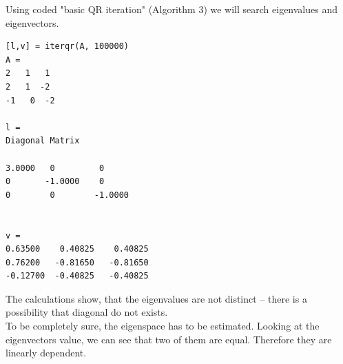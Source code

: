 \documentclass[eng,openany]{mgr}
\begin{document}
Using coded "basic QR iteration" (Algorithm 3) we will search eigenvalues and eigenvectors.

\begin{lstlisting}
[l,v] = iterqr(A, 100000)
A =
2   1   1
2   1  -2
-1   0  -2

l =
Diagonal Matrix

3.0000	 0         0
0		-1.0000    0
0        0        -1.0000


v =
0.63500    0.40825    0.40825 
0.76200   -0.81650   -0.81650 
-0.12700  -0.40825   -0.40825
\end{lstlisting}

The calculations show, that the eigenvalues are not distinct -- there is a possibility that diagonal do not exists.\\
To be completely sure, the eigenspace has to be estimated.
Looking at the eigenvectors value, we can see that two of them are equal. Therefore they are linearly dependent.
\\
\end{document}
